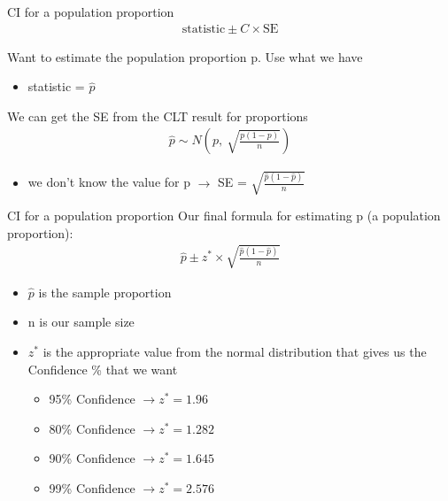 \documentclass{beamer}
\begin{document}
\begin{frame}{CI for a population proportion}
\begin{align*}
    \text{statistic} \pm C \times \text{SE}
\end{align*}

Want to estimate the population proportion p. Use what we have
\begin{itemize}
    \item statistic = $\widehat{p}$
\end{itemize} \vspace{8mm}

We can get the SE from the CLT result for proportions
\begin{align*}
\hat{p} \sim  N \left( p, \ \sqrt{\frac{p(1-p)}{n}} \right)
\end{align*}
\begin{itemize}

    \item we don't know the value for p $\rightarrow$ SE = $\sqrt{\frac{\widehat{p}(1-\widehat{p})}{n}}$
\end{itemize}
\end{frame}

\begin{frame}{CI for a population proportion}
Our final formula for estimating p (a population proportion):
\begin{align*}
    \widehat{p} \pm z^* \times \sqrt{\frac{\widehat{p}(1-\widehat{p})}{n}}
\end{align*}

\begin{itemize}
    \item $\widehat{p}$ is the sample proportion
    \item n is our sample size
    \item $z^*$ is the appropriate value from the normal distribution that gives us the Confidence \% that we want
    \begin{itemize}
        \item 95\% Confidence $\rightarrow z^* = 1.96$
        \item 80\% Confidence $\rightarrow z^* = 1.282$
        \item 90\% Confidence $\rightarrow z^* = 1.645$
        \item 99\% Confidence $\rightarrow z^* = 2.576$
    \end{itemize}
\end{itemize}
\end{frame}
\end{document}
